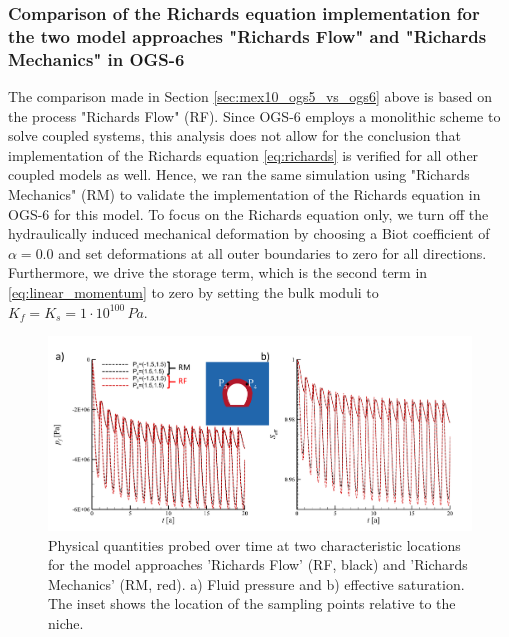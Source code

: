 \subsubsection{Comparison of the Richards equation implementation for the two model approaches "Richards Flow" and "Richards Mechanics" in OGS-6}\label{sec:RM_no_M}
The comparison made in Section \ref{sec:mex10_ogs5_vs_ogs6} above is based on the process "Richards Flow" (RF). Since OGS-6 employs a monolithic scheme to solve coupled systems, this analysis does not allow for the conclusion that implementation of the Richards equation \eqref{eq:richards} is verified for all other coupled models as well. Hence, we ran the same simulation using "Richards Mechanics" (RM) to validate the implementation of the Richards equation in OGS-6 for this model. To focus on the Richards equation only, we turn off the hydraulically induced mechanical deformation by choosing a Biot coefficient of $\alpha = 0.0$ and set deformations at all outer boundaries to zero for all directions. Furthermore, we drive the storage term, which is the second term in \eqref{eq:linear_momentum} to zero by setting the bulk moduli to $K_f=K_s=1\cdot 10^{100}\, Pa$. 

\begin{figure}[t]
\includegraphics[width=\textwidth]{./figures/MEX10_cf_RF_RM.png}
\caption{Physical quantities probed over time at two characteristic locations for the model approaches 'Richards Flow' (RF, black) and 'Richards Mechanics' (RM, red). a) Fluid pressure and b) effective saturation. The inset shows the location of the sampling points relative to the niche.}
\label{fig:probe_RM_RF}
\end{figure}


